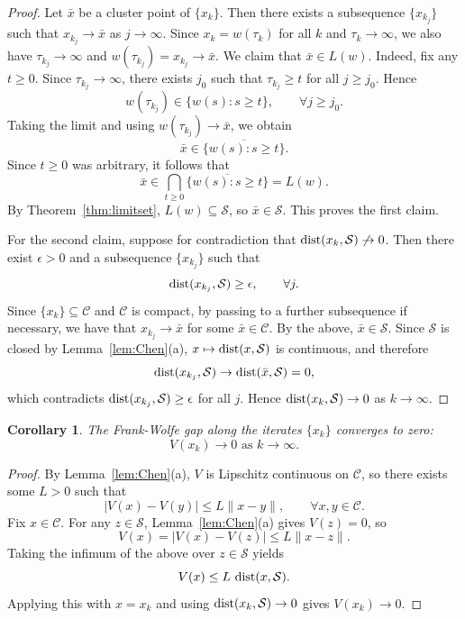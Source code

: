 \documentclass[pdflatex,sn-mathphys-num]{sn-jnl}%
\newcommand\dist{\mathop{\rm dist}}
\newcommand\C{\mathcal{C}}
\newcommand\mS{\mathcal{S}}
\theoremstyle{thmstyleone}%
\newtheorem{corollary}[theorem]{Corollary}%
\theoremstyle{thmstyletwo}%
\theoremstyle{thmstylethree}%
\begin{document}
\begin{proof}
Let $\bar x$ be a cluster point of $\{x_k\}$. Then there exists a subsequence
$\{x_{k_j}\}$ such that $x_{k_j} \to \bar{x}$ as $j \to \infty$.
Since $x_k = w(\tau_k)$ for all $k$ and $\tau_k \to \infty$, we also have
$\tau_{k_j} \to \infty$ and $w(\tau_{k_j}) = x_{k_j} \to \bar{x}$.
We claim that $\bar x \in L(w)$. Indeed, fix any $t\ge 0$. Since $\tau_{k_j}\to\infty$,
there exists $j_0$ such that $\tau_{k_j}\ge t$ for all $j\ge j_0$. Hence
\[
  w(\tau_{k_j}) \in \{w(s): s\geq t\}, \qquad \forall j\geq j_0.
\]
Taking the limit and using $w(\tau_{k_j})\to \bar x$, we obtain
\[
  \bar x \in \overline{\{w(s): s\geq t\}}.
\]
Since $t\geq 0$ was arbitrary, it follows that
\[
  \bar x \in \bigcap_{t\ge 0} \overline{\{w(s): s\ge t\}} = L(w).
\]
By Theorem~\ref{thm:limitset}, $L(w)\subseteq \mS$, so $\bar x \in \mS$.
This proves the first claim.

For the second claim, suppose for contradiction that $\dist(x_k,\mS) \not\to 0$.
Then there exist $\epsilon >0$ and a subsequence $\{x_{k_j}\}$ such that
\[
  \dist(x_{k_j},\mS) \geq \epsilon, \qquad \forall j.
\]
Since $\{x_k\}\subseteq \C$ and $\C$ is compact, by passing to a further subsequence if
necessary, we have that $x_{k_j}\to \bar x$ for some $\bar x\in\C$.
By the above, $\bar x\in \mS$. Since $\mS$ is closed by Lemma~\ref{lem:Chen}(a),
$x\mapsto \dist(x,\mS)$ is continuous, and therefore
\[
  \dist(x_{k_j},\mS) \to \dist(\bar x,\mS) = 0,
\]
which contradicts $\dist(x_{k_j},\mS) \geq \epsilon$ for all $j$.
Hence $\dist(x_k, \mS) \to 0$ as $k \to \infty$.
\end{proof}

\begin{corollary}
  The Frank-Wolfe gap along the iterates $\{x_k\}$ converges to zero:
  \[
    V(x_k) \to 0 \text{ as } k\to\infty.
  \]
\end{corollary}
\begin{proof}
  By Lemma~\ref{lem:Chen}(a), $V$ is Lipschitz continuous on $\C$, so there exists some $L>0$ such that
  \[
    \lvert V(x)-V(y)\rvert \leq L\lVert x-y\rVert, \qquad \forall x,y\in\C.
  \]
  Fix $x\in\C$. For any $z\in \mS$, Lemma~\ref{lem:Chen}(a) gives
  $V(z)=0$, so
  \[
    V(x)=|V(x)-V(z)| \leq L\|x-z\|.
  \]
  Taking the infimum of the above over $z\in \mS$ yields
  \[
    V(x)\leq L\,\dist(x,\mS).
  \]
  Applying this with $x=x_k$ and using $\dist(x_k,\mS)\to 0$ gives $V(x_k)\to 0$.
\end{proof}
\end{document}
